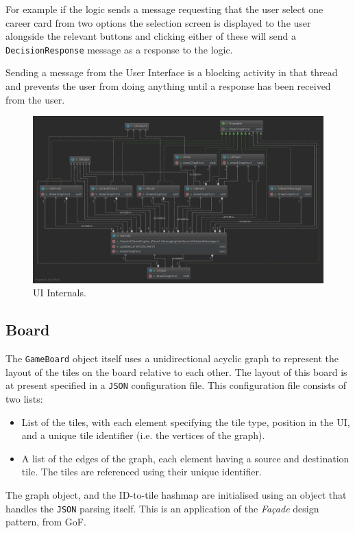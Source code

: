 \documentclass[a4paper, 11pt]{article}
\begin{document}
	For example if the logic sends a message requesting that the user select one career card from two options the selection screen is displayed to the user alongside the relevant buttons and clicking either of these will send a \texttt{DecisionResponse} message as a response to the logic.
	
	Sending a message from the User Interface is a blocking activity in that thread and prevents the user from doing anything until a response has been received from the user.
	\begin{figure}[H]
		\centering
		\includegraphics[scale=.35]{uml/ui_uml}
		\caption{UI Internals.}
		\label{fig:ui_uml}
	\end{figure}
	
	\subsection*{Board}
	The \texttt{GameBoard} object itself uses a unidirectional acyclic graph to represent the layout of the tiles on the board relative to each other. The layout of this board is at present specified in a \texttt{JSON} configuration file. This configuration file consists of two lists:
	\begin{itemize}
	\item List of the tiles, with each element specifying the tile type, position in the UI, and a unique tile identifier (i.e. the vertices of the graph).
	\item A list of the edges of the graph, each element having a source and destination tile. The tiles are referenced using their unique identifier.
	\end{itemize}
	
	The graph object, and the ID-to-tile hashmap are initialised using an object that handles the \texttt{JSON} parsing itself. This is an application of the \textit{Fa\c{c}ade} design pattern, from GoF.
	
\end{document}
